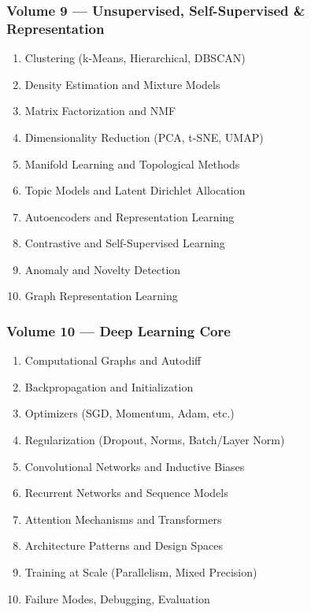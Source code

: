 \documentclass[
  letterpaper,
  DIV=11,
  numbers=noendperiod]{scrreprt}
\providecommand{\tightlist}{%
  \setlength{\itemsep}{0pt}\setlength{\parskip}{0pt}}
\begin{document}
\subsubsection{Volume 9 --- Unsupervised, Self-Supervised \&
Representation}\label{volume-9-unsupervised-self-supervised-representation}

\begin{enumerate}
\def\labelenumi{\arabic{enumi}.}
\setcounter{enumi}{80}
\tightlist
\item
  Clustering (k-Means, Hierarchical, DBSCAN)
\item
  Density Estimation and Mixture Models
\item
  Matrix Factorization and NMF
\item
  Dimensionality Reduction (PCA, t-SNE, UMAP)
\item
  Manifold Learning and Topological Methods
\item
  Topic Models and Latent Dirichlet Allocation
\item
  Autoencoders and Representation Learning
\item
  Contrastive and Self-Supervised Learning
\item
  Anomaly and Novelty Detection
\item
  Graph Representation Learning
\end{enumerate}

\subsubsection{Volume 10 --- Deep Learning
Core}\label{volume-10-deep-learning-core}

\begin{enumerate}
\def\labelenumi{\arabic{enumi}.}
\setcounter{enumi}{90}
\tightlist
\item
  Computational Graphs and Autodiff
\item
  Backpropagation and Initialization
\item
  Optimizers (SGD, Momentum, Adam, etc.)
\item
  Regularization (Dropout, Norms, Batch/Layer Norm)
\item
  Convolutional Networks and Inductive Biases
\item
  Recurrent Networks and Sequence Models
\item
  Attention Mechanisms and Transformers
\item
  Architecture Patterns and Design Spaces
\item
  Training at Scale (Parallelism, Mixed Precision)
\item
  Failure Modes, Debugging, Evaluation
\end{enumerate}
\end{document}
